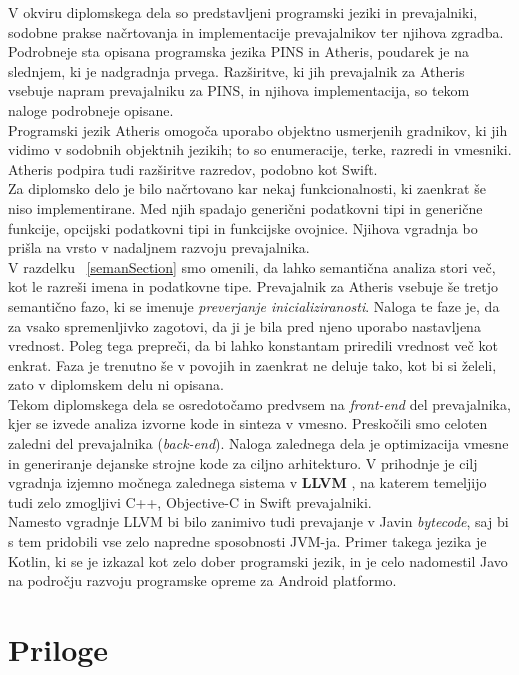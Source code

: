 \documentclass[a4paper, 12p]{book}
\begin{document}
V okviru diplomskega dela so predstavljeni programski jeziki in prevajalniki, sodobne prakse načrtovanja in implementacije prevajalnikov ter njihova zgradba. Podrobneje sta opisana programska jezika PINS in Atheris, poudarek je na slednjem, ki je nadgradnja prvega. Razširitve, ki jih prevajalnik za Atheris vsebuje napram prevajalniku za PINS, in njihova implementacija, so tekom naloge podrobneje opisane. \\
\indent Programski jezik Atheris omogoča uporabo objektno usmerjenih gradnikov, ki jih vidimo v sodobnih objektnih jezikih; to so enumeracije, terke, razredi in vmesniki. Atheris podpira tudi razširitve razredov, podobno kot Swift. \\
\indent Za diplomsko delo je bilo načrtovano kar nekaj funkcionalnosti, ki zaenkrat še niso implementirane. Med njih spadajo generični podatkovni tipi in generične funkcije, opcijski podatkovni tipi in funkcijske ovojnice. Njihova vgradnja bo prišla na vrsto v nadaljnem razvoju prevajalnika. \\
\indent  V razdelku ~\ref{semanSection} smo omenili, da lahko semantična analiza stori več, kot le razreši imena in podatkovne tipe. Prevajalnik za Atheris vsebuje še tretjo semantično fazo, ki se imenuje \textit{preverjanje inicializiranosti}. Naloga te faze je, da za vsako spremenljivko zagotovi, da ji je bila pred njeno uporabo nastavljena vrednost. Poleg tega prepreči, da bi lahko konstantam priredili vrednost več kot enkrat. Faza je trenutno še v povojih in zaenkrat ne deluje tako, kot bi si želeli, zato v diplomskem delu ni opisana. \\
\indent Tekom diplomskega dela se osredotočamo predvsem na \textit{front-end} del prevajalnika, kjer se izvede analiza izvorne kode in sinteza v vmesno. Preskočili smo celoten zaledni del prevajalnika (\textit{back-end}). Naloga zalednega dela je optimizacija vmesne in generiranje dejanske strojne kode za ciljno arhitekturo. V prihodnje je cilj vgradnja izjemno močnega zalednega sistema  v \textbf{LLVM} \cite{LLVM}, na katerem temeljijo tudi zelo zmogljivi C++, Objective-C in Swift prevajalniki. \\
\indent Namesto vgradnje LLVM bi bilo zanimivo tudi prevajanje v Javin \textit{bytecode}, saj bi s tem pridobili vse zelo napredne sposobnosti JVM-ja. Primer takega jezika je Kotlin, ki se je izkazal kot zelo dober programski jezik, in je celo nadomestil Javo na področju razvoju programske opreme za Android platformo.


\chapter{Priloge} 
\end{document}
